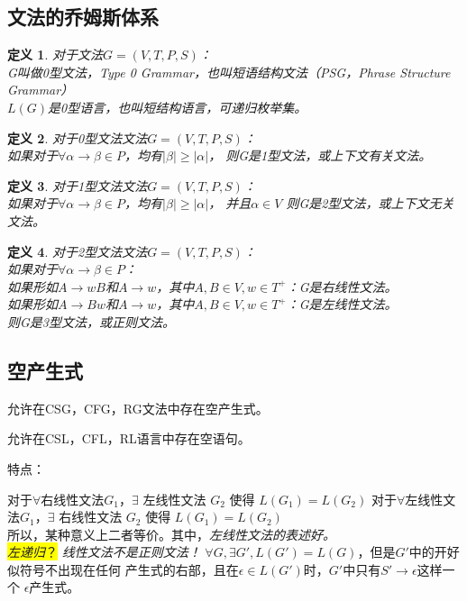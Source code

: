 \documentclass{ctexart}
\newcommand{\hl}[1]{\colorbox{yellow}{#1}}
\newtheorem{definition}{定义}[section]
\begin{document}
\subsection{文法的乔姆斯体系}
\begin{definition}
    对于文法$G = (V,T,P,S)$： \\
    G叫做0型文法，Type 0 Grammar，也叫短语结构文法（PSG，Phrase Structure Grammar） \\
    $L(G)$是0型语言，也叫短结构语言，可递归枚举集。
\end{definition}
\begin{definition}
    对于0型文法文法$G = (V,T,P,S)$： \\
    如果对于$\forall \alpha \to \beta \in P$，均有$|\beta| \geq |\alpha|$，
    则G是1型文法，或上下文有关文法。
\end{definition}
\begin{definition}
    对于1型文法文法$G = (V,T,P,S)$： \\
    如果对于$\forall \alpha \to \beta \in P$，均有$|\beta| \geq |\alpha|$，
    并且$\alpha \in V$
    则G是2型文法，或上下文无关文法。
\end{definition}
\begin{definition}
    对于2型文法文法$G = (V,T,P,S)$： \\
    如果对于$\forall \alpha \to \beta \in P$： \\
    如果形如$A \to wB$和$A \to w$，其中$A,B \in V, w \in T^+$：G是右线性文法。 \\
    如果形如$A \to Bw$和$A \to w$，其中$A,B \in V, w \in T^+$：G是左线性文法。 \\
    则G是3型文法，或正则文法。
\end{definition}

\subsection{空产生式}
允许在CSG，CFG，RG文法中存在空产生式。 

允许在CSL，CFL，RL语言中存在空语句。

特点：
\begin{outline}
    \1 对于$\forall$右线性文法$G_1$，$\exists$ 左线性文法 $G_2$ 使得 
    $L(G_1) = L(G_2)$
    \1 对于$\forall$左线性文法$G_1$，$\exists$ 右线性文法 $G_2$ 使得 
    $L(G_1) = L(G_2)$ \\
        所以，某种意义上二者等价。其中，\emph{左线性文法的表述好。}\\
        \hl{\emph{左递归}？}
        \emph{线性文法不是正则文法！}
    \1 $\forall G, \exists G', L(G') = L(G)$，但是$G'$中的开好似符号不出现在任何
    产生式的右部，且在$\epsilon \in L(G')$时，$G'$中只有$S' \to \epsilon$这样一个
    $\epsilon$产生式。
\end{outline}
\end{document}

